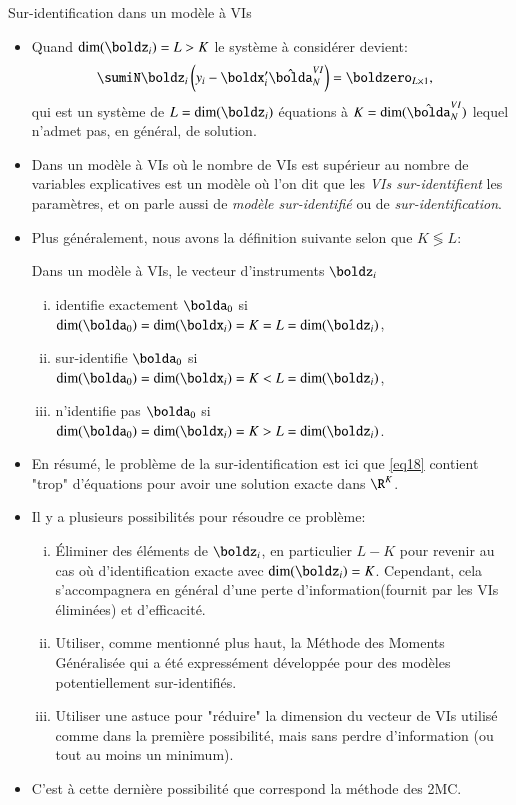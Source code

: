 \begin{frame}[allowframebreaks]{Sur-identification dans un modèle à VIs}
\begin{itemize}
\item Quand $\dim(\boldz_i) = L > K$ le système à considérer devient: 
\begin{align}
    \sumiN \boldz_i \left(y_i - \boldx_i^\prime\hat{\bolda}_N^{VI}\right)&=\boldzero_{L\times 1},
    \label{eq18}
\end{align}
    qui est un système de $L=\dim(\boldz_i)$ équations à $K= \dim(\hat{\bolda}_N^{VI}) $ 
    lequel n’admet pas, en général, de solution.
\item Dans un modèle à VIs où le nombre de VIs est supérieur 
au nombre de variables explicatives est un modèle où l'on dit  
que les \emph{VIs sur-identifient} les paramètres, et on parle aussi de \emph{modèle 
sur-identifié} ou de \emph{sur-identification}.

\item Plus généralement, nous avons la définition suivante selon que $K \lessgtr L$:
\begin{definition_fr}
    Dans un modèle à VIs, le vecteur d’instruments $\boldz_i$
\begin{enumerate}[(i)]
    \item identifie exactement $\bolda_0$ si $\dim(\bolda_0) = \dim(\boldx_i) = K = L = \dim(\boldz_i)$,
    \item sur-identifie $\bolda_0$ si $\dim(\bolda_0) = \dim(\boldx_i) = K < L = \dim(\boldz_i)$,
    \item n’identifie pas $\bolda_0$ si $\dim(\bolda_0) = \dim(\boldx_i) = K > L = \dim(\boldz_i)$.
\end{enumerate}
\end{definition_fr}

\framebreak

\item En résumé, le problème de la sur-identification  est ici que \eqref{eq18} contient  "trop" d’équations 
pour avoir une solution exacte dans $\R^K$.

\item Il y a plusieurs possibilités pour résoudre ce problème:
\begin{enumerate}[(i)]
\item Éliminer des éléments de $\boldz_i$, en particulier $L-K$ pour revenir au cas
 où d'identification exacte avec $\dim(\boldz_i)=K$. Cependant, cela s'accompagnera 
 en général d'une perte d'information(fournit par les VIs éliminées) et d'efficacité.
 \item Utiliser, comme mentionné plus haut, la Méthode des Moments Généralisée qui 
 a été expressément développée pour des modèles potentiellement sur-identifiés. 
 \item Utiliser une astuce pour "réduire" la dimension du vecteur de VIs
 utilisé comme dans la première possibilité, mais sans perdre d’information (ou tout au moins un minimum).
\end{enumerate}
\item C'est à cette dernière possibilité que correspond la méthode des 2MC.
\end{itemize}
\end{frame}

